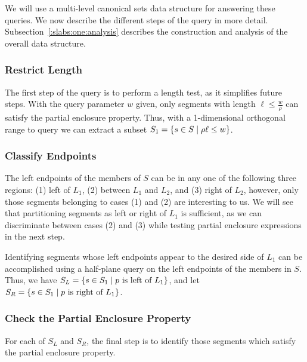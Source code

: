 We will use a multi-level canonical sets data structure 
\cite{chan2012} for answering these queries. 
We now describe the different steps of the query in more detail. 
Subsection~\ref{:slabs:one:analysis} describes the construction 
and analysis of the overall data structure.


\subsubsection{Restrict Length}
The first step of the query is to perform a length test, as it 
simplifies future steps. With the query parameter $w$ given, 
only segments with length $\ell \leq \frac{w}{\rho}$ can satisfy 
the partial enclosure property. Thus, with a 1-dimensional 
orthogonal range to query we can extract a subset 
$S_1 = \{ s\in S \;|\; \rho \ell \leq w \}$.


\subsubsection{Classify Endpoints}
The left endpoints of the members of $S$ can be in any one of the following three 
regions: (1) left of $L_1$, (2) between $L_1$ and $L_2$, and (3) right 
of $L_2$, however, only those segments belonging to cases (1) and (2) 
are interesting to us. We will see that partitioning segments as left 
or right of $L_1$ is sufficient, as we can discriminate between cases 
(2) and (3) while testing partial enclosure expressions in the next step.

Identifying segments whose left endpoints appear to the desired side of 
$L_1$ can be accomplished using a half-plane query on the left endpoints 
of the members in $S$. Thus, we have $S_L = \{ s \in S_1 \;|\; p \text{ is 
left of } L_1 \}$, and let $S_R = \{ s \in S_1 \;|\; p \text{ is right of 
} L_1 \}$.


\subsubsection{Check the Partial Enclosure Property}
For each of $S_L$ and $S_R$, the final step is to identify those segments 
which satisfy the partial enclosure property.

